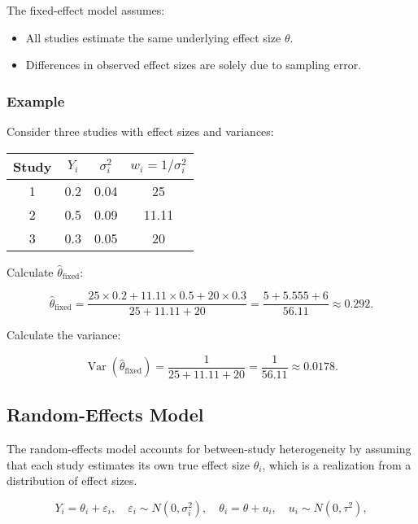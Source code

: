\documentclass[12pt,a4paper]{report}
\newcommand{\Var}{\operatorname{Var}}
\begin{document}
The fixed-effect model assumes:

\begin{itemize}
    \item All studies estimate the same underlying effect size $\theta$.
    \item Differences in observed effect sizes are solely due to sampling error.
\end{itemize}

\subsubsection{Example}
\label{subsubsec:fixed_example}

Consider three studies with effect sizes and variances:

\begin{center}
\begin{tabular}{cccc}
\toprule
\textbf{Study} & $Y_i$ & $\sigma_i^2$ & $w_i = 1/\sigma_i^2$ \\
\midrule
1 & 0.2 & 0.04 & 25 \\
2 & 0.5 & 0.09 & 11.11 \\
3 & 0.3 & 0.05 & 20 \\
\bottomrule
\end{tabular}
\end{center}

Calculate $\hat{\theta}_{\text{fixed}}$:

\[
\hat{\theta}_{\text{fixed}} = \frac{25 \times 0.2 + 11.11 \times 0.5 + 20 \times 0.3}{25 + 11.11 + 20} = \frac{5 + 5.555 + 6}{56.11} \approx 0.292.
\]

Calculate the variance:

\[
\Var(\hat{\theta}_{\text{fixed}}) = \frac{1}{25 + 11.11 + 20} = \frac{1}{56.11} \approx 0.0178.
\]

\subsection{Random-Effects Model}
\label{subsec:random_effects_model}

The random-effects model accounts for between-study heterogeneity by assuming that each study estimates its own true effect size $\theta_i$, which is a realization from a distribution of effect sizes.

\begin{equation}
\label{eq:random_effects_model}
Y_i = \theta_i + \varepsilon_i, \quad \varepsilon_i \sim N(0, \sigma_i^2), \quad \theta_i = \theta + u_i, \quad u_i \sim N(0, \tau^2),
\end{equation}
\end{document}
